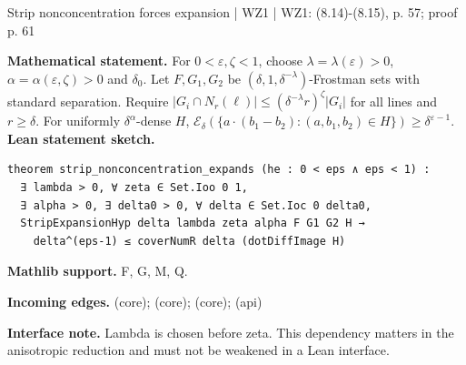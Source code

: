 \documentclass[10pt,a4paper]{article}
\newcommand{\nodecard}[1]{\hyperlink{node-#1}{\texttt{\detokenize{#1}}}}
\begin{document}
\begin{minipage}{\linewidth}
\hypertarget{node-P8_5}{}
\begin{tcolorbox}[colback=white,colframe=radialfg,colbacktitle=radialbg,coltitle=ink,boxrule=0.45pt,arc=1.6mm,left=3mm,right=3mm,top=2mm,bottom=2mm,title={\sffamily\bfseries WZ1 Proposition 8.5 \hfill \texttt{P8\_5}}]
{\sffamily\small\color{muted}Strip nonconcentration forces expansion | WZ1 | WZ1: (8.14)-(8.15), p. 57; proof p. 61}\par
\textbf{Mathematical statement.} For $0<\varepsilon,\zeta<1$, choose $\lambda=\lambda(\varepsilon)>0$, $\alpha=\alpha(\varepsilon,\zeta)>0$ and $\delta_0$.
Let $F,G_1,G_2$ be $(\delta,1,\delta^{-\lambda})$-Frostman sets with standard separation. Require
$|G_i\cap N_r(\ell)|\le(\delta^{-\lambda}r)^\zeta|G_i|$ for all lines and $r\ge\delta$.
For uniformly $\delta^\alpha$-dense $H$,
$\mathcal E_\delta(\{a\cdot(b_1-b_2):(a,b_1,b_2)\in H\})\ge\delta^{\varepsilon-1}$.
\smallskip\textbf{Lean statement sketch.}
\begin{Verbatim}[fontsize=\small,breaklines=true,breakanywhere=true,tabsize=2]
theorem strip_nonconcentration_expands (he : 0 < eps ∧ eps < 1) :
  ∃ lambda > 0, ∀ zeta ∈ Set.Ioo 0 1,
  ∃ alpha > 0, ∃ delta0 > 0, ∀ delta ∈ Set.Ioc 0 delta0,
  StripExpansionHyp delta lambda zeta alpha F G1 G2 H →
    delta^(eps-1) ≤ coverNumR delta (dotDiffImage H)
\end{Verbatim}
{\footnotesize\textbf{Mathlib support.} F, G, M, Q.\par
\textbf{Incoming edges.} \nodecard{L8_8} (core); \nodecard{C8_7} (core); \nodecard{L8_4} (core); \nodecard{Iparams} (api)\par}
{\footnotesize\textbf{Interface note.} Lambda is chosen before zeta. This dependency matters in the anisotropic reduction and must not be weakened in a Lean interface.}
\end{tcolorbox}\end{minipage}\par\medskip
\end{document}
